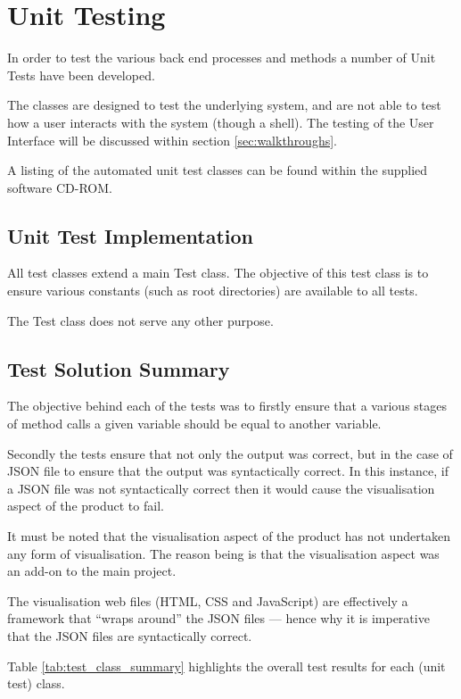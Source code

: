 \section{Unit Testing}
\label{sec:unit_testing}

In order to test the various back end processes and methods a number of Unit 
Tests have been developed.

The classes are designed to test the underlying system, and are not able to 
test how a user interacts with the system (though a shell). The testing of the 
User Interface will be discussed within section \ref{sec:walkthroughs}.

A listing of the automated unit test classes can be found within the supplied 
software CD-ROM.

\subsection{Unit Test Implementation}

All test classes extend a main {\ttfamily Test} class. The objective of this 
test class is to ensure various constants (such as root directories) are 
available to all tests.

The Test class does not serve any other purpose.

\subsection{Test Solution Summary}
The objective behind each of the tests was to firstly ensure that a various 
stages of method calls a given variable should be equal to another variable. 

Secondly the tests ensure that not only the output was correct, but in the case
of JSON file to ensure that the output was syntactically correct. In this 
instance, if a JSON file was not syntactically correct then it would cause the 
visualisation aspect of the product to fail.

It must be noted that the visualisation aspect of the product has not 
undertaken any form of visualisation. The reason being is that the 
visualisation aspect was an add-on to the main project. 

The visualisation web files (HTML, CSS and JavaScript) are effectively a 
framework that ``wraps around'' the JSON files --- hence why it is imperative 
that the JSON files are syntactically correct.

Table \ref{tab:test_class_summary} highlights the overall test results for each 
(unit test) class.


